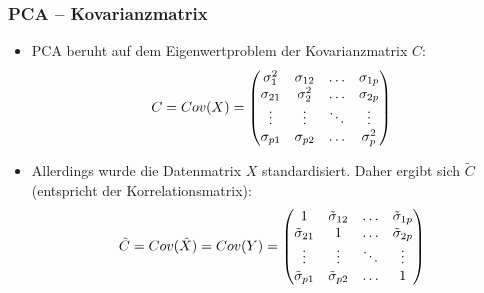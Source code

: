 
\begin{frame}

\frametitle{PCA -- Kovarianzmatrix}

\begin{itemize}
\setlength{\itemsep}{10pt}
\item PCA beruht auf dem Eigenwertproblem der Kovarianzmatrix $C$:
\begin{equation}
C = Cov(X)=\begin{pmatrix}
\sigma_{1}^2 	& \sigma_{12} 	& \hdots 	& \sigma_{1p}	\\
\sigma_{21} 	& \sigma_{2}^2 	& \hdots 	& \sigma_{2p} 	\\
\vdots 			& \vdots 		& \ddots 	& \vdots 		\\
\sigma_{p1} 	& \sigma_{p2} 	& \hdots 	& \sigma_{p}^2	\\
\end{pmatrix} \notag
\end{equation}
\item Allerdings wurde die Datenmatrix $X$ standardisiert. Daher ergibt sich $\tilde{C}$ (entspricht der Korrelationsmatrix):
\begin{equation}
\tilde{C}=Cov(\tilde{X})=Cov(Y)=
\begin{pmatrix}
1 						& \tilde{\sigma}_{12} 	& \hdots 	& \tilde{\sigma}_{1p}	\\
\tilde{\sigma}_{21} 	& 1 					& \hdots 	& \tilde{\sigma}_{2p} 	\\
\vdots 					& \vdots 				& \ddots 	& \vdots 				\\
\tilde{\sigma}_{p1} 	& \tilde{\sigma}_{p2} 	& \hdots 	& 1						\\
\end{pmatrix} \notag
\end{equation}
\end{itemize}

\end{frame}







